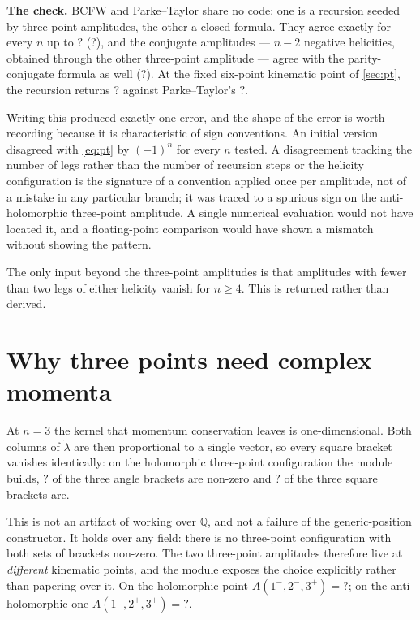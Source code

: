 \documentclass[11pt,a4paper]{article}
\newcommand{\TFBcfwMax}{?}\newcommand{\TFBcfwAgree}{?}
\newcommand{\TFBcfwAntiAgree}{?}\newcommand{\TFSixPointMHV}{?}
\newcommand{\TFSixPointBCFW}{?}\newcommand{\TFThreePtSquares}{?}
\newcommand{\TFThreePtAngles}{?}\newcommand{\TFThreePtHol}{?}
\newcommand{\TFThreePtAnti}{?}\newcommand{\TFNmhvValue}{?}
\newcommand{\QQ}{\mathbb{Q}}
\theoremstyle{definition}
\begin{document}
\begin{framed}
\noindent
\textbf{The check.} BCFW and Parke--Taylor share no code: one is a recursion
seeded by three-point amplitudes, the other a closed formula. They agree
exactly for every $n$ up to $\TFBcfwMax$ (\TFBcfwAgree), and the conjugate
amplitudes --- $n-2$ negative helicities, obtained through the other
three-point amplitude --- agree with the parity-conjugate formula as well
(\TFBcfwAntiAgree). At the fixed six-point kinematic point of \cref{sec:pt},
the recursion returns $\TFSixPointBCFW$ against Parke--Taylor's
$\TFSixPointMHV$.
\end{framed}

\noindent
Writing this produced exactly one error, and the shape of the error is worth
recording because it is characteristic of sign conventions. An initial
version disagreed with \cref{eq:pt} by $(-1)^n$ for every $n$ tested. A
disagreement tracking the number of legs rather than the number of recursion
steps or the helicity configuration is the signature of a convention applied
once per amplitude, not of a mistake in any particular branch; it was traced
to a spurious sign on the anti-holomorphic three-point amplitude. A single
numerical evaluation would not have located it, and a floating-point
comparison would have shown a mismatch without showing the pattern.

The only input beyond the three-point amplitudes is that amplitudes with
fewer than two legs of either helicity vanish for $n \geq 4$. This is returned
rather than derived.


\section{Why three points need complex momenta}
\label{sec:threepoint}

At $n = 3$ the kernel that momentum conservation leaves is one-dimensional.
Both columns of $\tilde\lambda$ are then proportional to a single vector, so
every square bracket vanishes identically: on the holomorphic three-point
configuration the module builds, $\TFThreePtAngles$ of the three angle
brackets are non-zero and $\TFThreePtSquares$ of the three square brackets
are.

This is not an artifact of working over $\QQ$, and not a failure of the
generic-position constructor. It holds over any field: there is no three-point
configuration with both sets of brackets non-zero. The two three-point
amplitudes therefore live at \emph{different} kinematic points, and the module
exposes the choice explicitly rather than papering over it. On the
holomorphic point $A(1^-,2^-,3^+) = \TFThreePtHol$; on the anti-holomorphic
one $A(1^-,2^+,3^+) = \TFThreePtAnti$.
\end{document}
